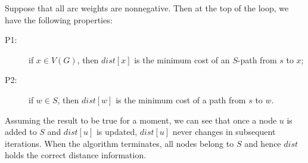 \begin{Theorem}
\label{thm:dijkstra} Suppose that all arc weights are nonnegative. Then
at the top of the  loop, we have the following properties:
\begin{description}
\item[P1:] if $x\in V(G)$, then $dist[x]$ is the minimum cost of an $S$-path 
from $s$ to $x$;
\item[P2:] if $w\in S$, then $dist[w]$ is the minimum cost of a path
from $s$ to $w$.
\end{description}
\end{Theorem}

\begin{note} Assuming the result to be true for a moment, we can see
that once a node $u$ is added to $S$ and $dist[u]$ is updated, $dist[u]$
never changes in subsequent iterations. When the algorithm terminates,
all nodes belong to $S$ and hence $dist$ holds the correct distance information.
\end{note}
